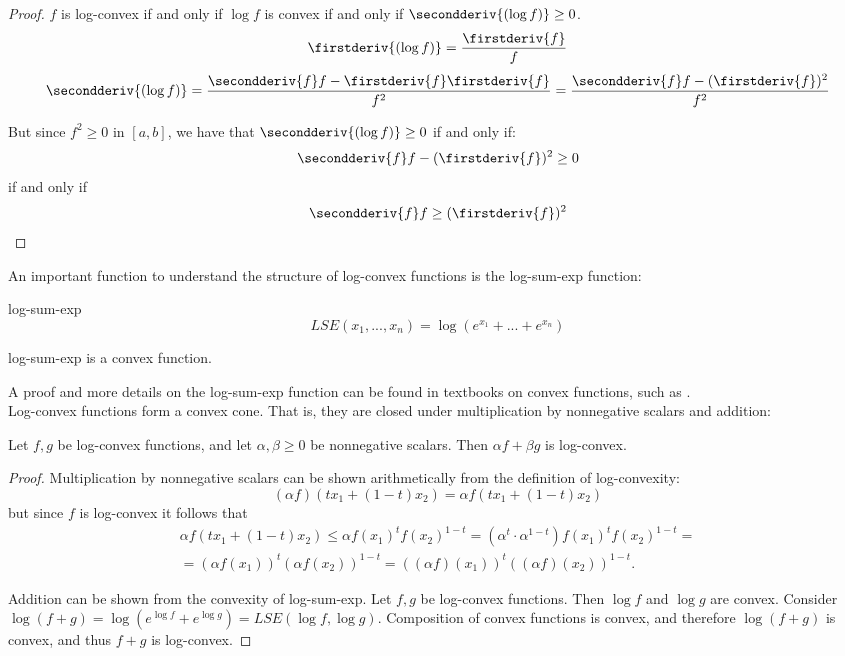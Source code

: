 \documentclass[12pt,a4paper]{article}
\begin{document}
\begin{proof}
$f$ is log-convex if and only if $\log f$ is convex if and only if $\secondderiv{(\log f)} \geq 0$.
$$\firstderiv{(\log f)} = \frac{\firstderiv{f}}{f}$$
$$\secondderiv{(\log f)} = \frac{\secondderiv{f}f - \firstderiv{f}\firstderiv{f}}{f^2} = \frac{\secondderiv{f}f - (\firstderiv{f})^2}{f^2}$$

But since $f^2 \geq 0$ in $[a,b]$, we have that $\secondderiv{(\log f)} \geq 0$ if and only if:
$$\secondderiv{f}f - (\firstderiv{f})^2 \geq 0$$ if and only if
$$\secondderiv{f}f \geq (\firstderiv{f})^2$$
\end{proof}

An important function to understand the structure of log-convex functions is the log-sum-exp function:

\begin{definition}{log-sum-exp}
\begin{equation}
LSE(x_1,...,x_n) = \log(e^{x_1}+...+e^{x_n})
\end{equation}
\end{definition}

\begin{lemma}
log-sum-exp is a convex function.
\end{lemma}

A proof and more details on the log-sum-exp function can be found in textbooks on convex functions, such as \cite{2004_boyd_convex_optimization}.\\

Log-convex functions form a convex cone. That is, they are closed under multiplication by nonnegative scalars and addition:

\begin{lemma}
Let $f, g$ be log-convex functions, and let $\alpha, \beta \geq 0$ be nonnegative scalars. Then $\alpha f + \beta g$ is log-convex.
\end{lemma}

\begin{proof}
Multiplication by nonnegative scalars can be shown arithmetically from the definition of log-convexity:
$$(\alpha f)(t x_1 + (1-t) x_2) = \alpha f(t x_1 + (1-t) x_2)$$
but since $f$ is log-convex it follows that
\begin{equation*}
\begin{array}{l}
\alpha f(t x_1 + (1-t) x_2) \leq \alpha f(x_1)^t f(x_2)^{1-t} = (\alpha^t \cdot \alpha^{1-t}) f(x_1)^t f(x_2)^{1-t} =\\
= (\alpha f(x_1))^t (\alpha f(x_2))^{1-t} = ((\alpha f)(x_1))^t ((\alpha f)(x_2))^{1-t}.
\end{array}
\end{equation*}

Addition can be shown from the convexity of log-sum-exp. Let $f,g$ be log-convex functions. Then $\log f$ and $\log g$ are convex. Consider $\log (f+g) = \log(e^{\log f} + e^{\log g}) = LSE(\log f, \log g)$. Composition of convex functions is convex, and therefore $\log (f+g)$ is convex, and thus $f+g$ is log-convex.
\end{proof}
\end{document}
